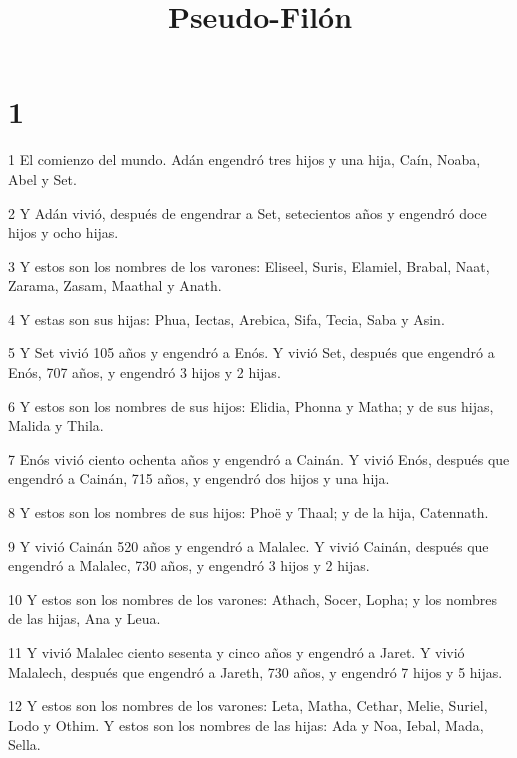 

\title{Pseudo-Filón}

\chapter{1}

\par 1 El comienzo del mundo. Adán engendró tres hijos y una hija, Caín, Noaba, Abel y Set.

\par 2 Y Adán vivió, después de engendrar a Set, setecientos años y engendró doce hijos y ocho hijas.

\par 3 Y estos son los nombres de los varones: Eliseel, Suris, Elamiel, Brabal, Naat, Zarama, Zasam, Maathal y Anath.

\par 4 Y estas son sus hijas: Phua, Iectas, Arebica, Sifa, Tecia, Saba y Asin.

\par 5 Y Set vivió 105 años y engendró a Enós. Y vivió Set, después que engendró a Enós, 707 años, y engendró 3 hijos y 2 hijas.

\par 6 Y estos son los nombres de sus hijos: Elidia, Phonna y Matha; y de sus hijas, Malida y Thila.

\par 7 Enós vivió ciento ochenta años y engendró a Cainán. Y vivió Enós, después que engendró a Cainán, 715 años, y engendró dos hijos y una hija.

\par 8 Y estos son los nombres de sus hijos: Phoë y Thaal; y de la hija, Catennath.

\par 9 Y vivió Cainán 520 años y engendró a Malalec. Y vivió Cainán, después que engendró a Malalec, 730 años, y engendró 3 hijos y 2 hijas.

\par 10 Y estos son los nombres de los varones: Athach, Socer, Lopha; y los nombres de las hijas, Ana y Leua.

\par 11 Y vivió Malalec ciento sesenta y cinco años y engendró a Jaret. Y vivió Malalech, después que engendró a Jareth, 730 años, y engendró 7 hijos y 5 hijas.

\par 12 Y estos son los nombres de los varones: Leta, Matha, Cethar, Melie, Suriel, Lodo y Othim. Y estos son los nombres de las hijas: Ada y Noa, Iebal, Mada, Sella.

